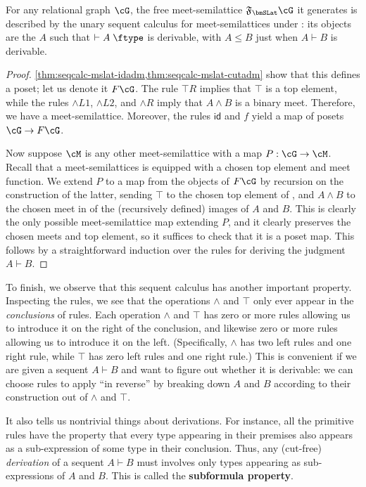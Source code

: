 \documentclass{book}
\def\idfunc{\mathsf{id}}
\let\types\vdash
\def\type{\;\ftype}
\newcommand{\F}[1]{\mathfrak{F}_{#1}}
\let\meet\wedge
\def\meetL{\mathord{\meet}L}
\def\meetR{\mathord{\meet}R}
\begin{document}
\begin{thm}\label{thm:seqcalc-mslat-initial}
  For any relational graph $\cG$, the free meet-semilattice $\F\bmSLat \cG$ it generates is described by the unary sequent calculus for meet-semilattices under \cG: its objects are the $A$ such that $\types A\type$ is derivable, with $A\le B$ just when $A\types B$ is derivable.
\end{thm}
\begin{proof}
  \cref{thm:seqcalc-mslat-idadm,thm:seqcalc-mslat-cutadm} show that this defines a poset; let us denote it $F\cG$.
  The rule $\top R$ implies that $\top$ is a top element, while the rules $\meetL1$, $\meetL2$, and $\meetR$ imply that $A\meet B$ is a binary meet.
  Therefore, we have a meet-semilattice.
  Moreover, the rules $\idfunc$ and $f$ yield a map of posets $\cG\to F\cG$.

  Now suppose $\cM$ is any other meet-semilattice with a map $P:\cG\to\cM$.
  Recall that a meet-semilattices is equipped with a chosen top element and meet function.
  We extend $P$ to a map from the objects of $F\cG$ by recursion on the construction of the latter, sending $\top$ to the chosen top element of \cM, and $A\meet B$ to the chosen meet in \cM of the (recursively defined) images of $A$ and $B$.
  This is clearly the only possible meet-semilattice map extending $P$, and it clearly preserves the chosen meets and top element, so it suffices to check that it is a poset map.
  This follows by a straightforward induction over the rules for deriving the judgment $A\types B$.
\end{proof}

To finish, we observe that this sequent calculus has another important property.
Inspecting the rules, we see that the operations $\meet$ and $\top$ only ever appear in the \emph{conclusions} of rules.
Each operation $\meet$ and $\top$ has zero or more rules allowing us to introduce it on the right of the conclusion, and likewise zero or more rules allowing us to introduce it on the left.
(Specifically, $\meet$ has two left rules and one right rule, while $\top$ has zero left rules and one right rule.)
This is convenient if we are given a sequent $A\types B$ and want to figure out whether it is derivable: we can choose rules to apply ``in reverse'' by breaking down $A$ and $B$ according to their construction out of $\meet$ and $\top$.

It also tells us nontrivial things about derivations.
For instance, all the primitive rules have the property that every type appearing in their premises also appears as a sub-expression of some type in their conclusion.
Thus, any (cut-free) \emph{derivation} of a sequent $A\types B$ must involves only types appearing as sub-expressions of $A$ and $B$.
This is called the \textbf{subformula property}.
\end{document}
